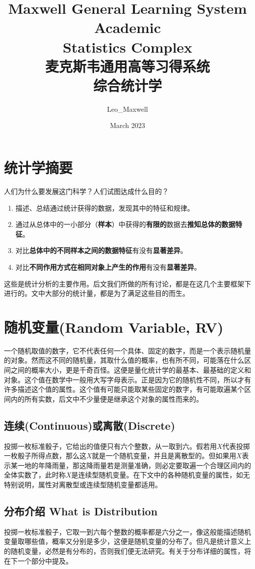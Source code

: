 \documentclass[UTF8]{ctexbook}
\title{Maxwell General Learning System Academic\\ Statistics Complex\\ 麦克斯韦通用高等习得系统\\ 综合统计学}
\author{Leo\_Maxwell }
\date{March 2023}
\begin{document}
\maketitle

\tableofcontents
\newpage

\chapter*{统计学摘要}
人们为什么要发展这门科学？人们试图达成什么目的？
\begin{enumerate}
	\item 描述、总结通过统计获得的数据，发现其中的特征和规律。
	\item 通过从总体中的一小部分（\textbf{样本}）中获得的\textbf{有限的}数据去\textbf{推知总体的数据特征}。
	\item 对比\textbf{总体中的不同样本之间的数据特征}有没有\textbf{显著差异}。
	\item 对比\textbf{不同作用方式在相同对象上产生的作用}有没有\textbf{显著差异}。
\end{enumerate}

这些是统计分析的主要作用。后文我们所做的所有讨论，都是在这几个主要框架下进行的。文中大部分的统计量，都是为了满足这些目的而生。
\chapter{随机变量(Random Variable, RV)}
一个随机取值的数字，它不代表任何一个具体、固定的数字，而是一个表示随机量的对象。然而这不同的随机量，其取什么值的概率，也有所不同，可能落在什么区间之间的概率大小，更是千奇百怪。这便是量化统计学的最基本、最基础的定义和对象。这个值在数学中一般用大写字母表示。正是因为它的随机性不同，所以才有许多描述这个值的属性。这个值有可能只能取某些固定的数字，有可能取遍某个区间内的所有实数，后文中不少量便是继承这个对象的属性而来的。
\section{连续(Continuous)或离散(Discrete)}
投掷一枚标准骰子，它给出的值便只有六个整数，从一取到六。假若用$X$代表投掷一枚骰子所得点数，那么这$X$就是一个随机变量，并且是离散型的。但如果用$X$表示某一地的年降雨量，那这降雨量若是测量准确，则必定要取遍一个合理区间内的全体实数了，此时称$X$是连续型随机变量。在下文中的各种随机变量的属性，如无特别说明，属性对离散型或连续型随机变量都适用。
\section{分布介绍 What is Distribution}
投掷一枚标准骰子，它取一到六每个整数的概率都是六分之一，像这般能描述随机变量取哪些值，概率又分别是多少，这便是随机变量的分布了。但凡是统计意义上的随机变量，必然是有分布的，否则我们便无法研究。有关于分布详细的属性，将在下一个部分中提及。
\end{document}
